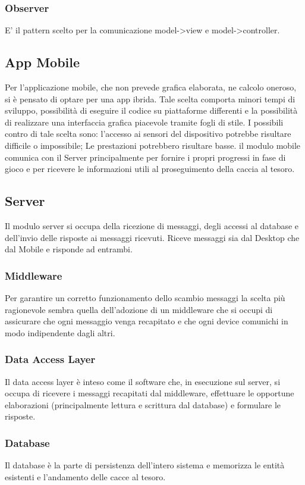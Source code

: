 \documentclass[12pt, italian]{article}
\begin{document}
\subsubsection*{Observer}
E' il pattern scelto per la comunicazione model->view e model->controller.

\subsection{App Mobile}
Per l'applicazione mobile, che non prevede grafica elaborata, ne calcolo oneroso, si è pensato di optare per una app ibrida.
Tale scelta comporta minori tempi di sviluppo, possibilità di eseguire il codice su piattaforme differenti e la possibilità di realizzare una interfaccia grafica piacevole tramite fogli di stile.
I possibili contro di tale scelta sono: l'accesso ai sensori del dispositivo potrebbe risultare difficile o impossibile; Le prestazioni potrebbero risultare basse.
il modulo mobile comunica con il Server principalmente per fornire i propri progressi in fase di gioco e per ricevere le informazioni utili al proseguimento della caccia al tesoro.

\subsection{Server}
Il modulo server si occupa della ricezione di messaggi, degli accessi al database e dell'invio delle risposte ai messaggi ricevuti. Riceve messaggi sia dal Desktop che dal Mobile e risponde ad entrambi.
\subsubsection{Middleware}
Per garantire un corretto funzionamento dello scambio messaggi la scelta più ragionevole sembra quella dell'adozione di un middleware che si occupi di assicurare che ogni messaggio venga recapitato e che ogni device comunichi in modo indipendente dagli altri.
\subsubsection{Data Access Layer}
Il data access layer è inteso come il software che, in esecuzione sul server, si occupa di ricevere i messaggi recapitati dal middleware, effettuare le opportune elaborazioni (principalmente lettura e scrittura dal database) e formulare le risposte.
\subsubsection{Database}
Il database è la parte di persistenza dell'intero sistema e memorizza le entità esistenti e l'andamento delle cacce al tesoro.
\end{document}
